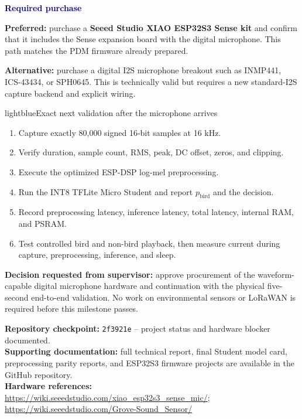 \documentclass[10pt,a4paper]{article}
\newcommand{\boxhead}[1]{\textcolor{navy}{\textbf{#1}}}
\begin{document}
\boxhead{Required purchase}

\textbf{Preferred:} purchase a \textbf{Seeed Studio XIAO ESP32S3 Sense kit} and confirm that it includes the Sense expansion board with the digital microphone. This path matches the PDM firmware already prepared.

\textbf{Alternative:} purchase a digital I2S microphone breakout such as INMP441, ICS-43434, or SPH0645. This is technically valid but requires a new standard-I2S capture backend and explicit wiring.

\begin{summarybox}{lightblue}{Exact next validation after the microphone arrives}
\begin{enumerate}
  \item Capture exactly 80,000 signed 16-bit samples at 16 kHz.
  \item Verify duration, sample count, RMS, peak, DC offset, zeros, and clipping.
  \item Execute the optimized ESP-DSP log-mel preprocessing.
  \item Run the INT8 TFLite Micro Student and report $p_{\mathrm{bird}}$ and the decision.
  \item Record preprocessing latency, inference latency, total latency, internal RAM, and PSRAM.
  \item Test controlled bird and non-bird playback, then measure current during capture, preprocessing, inference, and sleep.
\end{enumerate}
\end{summarybox}

\textbf{Decision requested from supervisor:} approve procurement of the waveform-capable digital microphone hardware and continuation with the physical five-second end-to-end validation. No work on environmental sensors or LoRaWAN is required before this milestone passes.

\vfill
{\footnotesize
\textbf{Repository checkpoint:} \texttt{2f3921e} -- project status and hardware blocker documented.\\
\textbf{Supporting documentation:} full technical report, final Student model card, preprocessing parity reports, and ESP32S3 firmware projects are available in the GitHub repository.\\
\textbf{Hardware references:} \url{https://wiki.seeedstudio.com/xiao_esp32s3_sense_mic/}; \url{https://wiki.seeedstudio.com/Grove-Sound_Sensor/}
}
\end{document}
